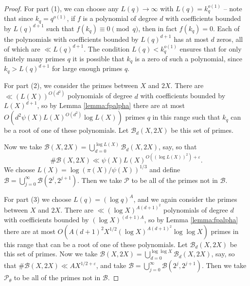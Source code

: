 \documentclass[12pt, a4paper]{amsart}
\theoremstyle{remark}
\newcommand{\cP}{\mathcal{P}}
\newcommand{\cB}{\mathcal{B}}
\begin{document}
\begin{proof}
    For part (1), we can choose any $L(q)\to\infty$ with $L(q) = k_q^{o(1)}$ -- note that since $k_q = q^{o(1)}$, if $f$ is a polynomial of
        degree $d$ with coefficients bounded by $L(q)^{d+1}$ such that
        $f(k_q)\equiv 0\pmod q$, then in fact $f(k_q)=0$. Each of the
        polynomials with coefficients bounded by $L(q)^{d+1}$ has at most $d$
        zeros, all of which are $\ll L(q)^{d+1}$. The condition $L(q) < k_q^{o(1)}$
        ensures that for only finitely many primes $q$ it is possible that $k_q$
        is a zero of such a polynomial, since $k_q>L(q)^{d+1}$ for large enough
        primes $q$. 

    For part (2), we consider the primes between $X$ and $2X$.
        There are $\ll(L(X))^{O(d^2)}$ polynomials of degree $d$ with
        coefficients bounded by $L(X)^{d+1}$, so by Lemma
        \ref{lemma:fpalpha} there are at most $O(d^2 \psi(X)L(X)^{O(d^2)}\log L(X))$
        primes $q$ in this range such that $k_q$ can be a
        root of one of these polynomials. Let $\cB_d(X,2X)$ be this set of
        primes.

        Now we take $\cB(X,2X) = \bigcup_{d=0}^{\log L(X)} \cB_d(X, 2X)$,
        say, so that
        \[
            \#\cB(X,2X) \ll \psi(X) L(X)^{O((\log L(X))^2) + \varepsilon}.
        \]
        We choose $L(X) = \log(\pi(X)/\psi(X))^{1/3}$ and define $\cB =
        \bigcup_{j=0}^\infty \cB(2^j, 2^{j+1})$. Then we take $\cP$ to be all
        of the primes not in $\cB$.

    For part (3) we choose $L(q) = (\log q)^A$, and we again consider the
    primes between $X$ and $2X$. There are $\ll (\log X)^{A(d+1)^2}$
    polynomials of degree $d$ with coefficients bounded by $(\log X)^{(d+1)A}$,
    so by Lemma \ref{lemma:fpalpha} there are at most
    $O(A (d+1)^2 X^{1/2}(\log X)^{A(d+1)^2}\log\log X)$ primes in this range that
    can be a root of one of these polynomials. Let $\cB_d(X,2X)$ be this
    set of primes.
    Now we take $\cB(X,2X) = \bigcup_{d=0}^{\log\log X} \cB_d(X, 2X)$, say, so that
    $\#\cB(X,2X) \ll A X^{1/2 + \varepsilon}$, and take
    $\cB = \bigcup_{j=0}^\infty \cB(2^j, 2^{j+1})$.
    Then we take $\cP_\theta$ to be all of the primes not in $\cB$.
\end{proof}
\end{document}

